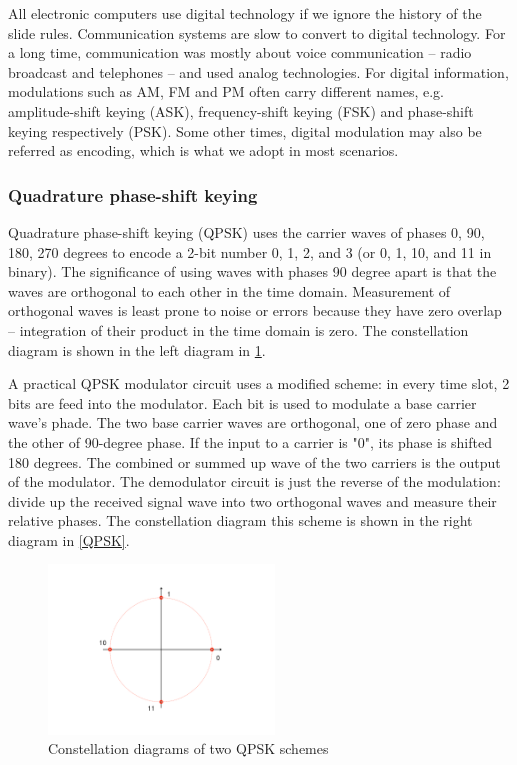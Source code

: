 \documentclass{book}
\begin{document}
All electronic computers use digital technology if we ignore the history of the slide rules. Communication systems are slow to convert to digital technology. For a long time, communication was mostly about voice communication -- radio broadcast and telephones -- and used analog technologies. For digital information, modulations such as AM, FM and PM often carry different names, e.g. amplitude-shift keying (ASK), frequency-shift keying (FSK) and phase-shift keying respectively (PSK). Some other times, digital modulation may also be referred as encoding, which is what we adopt in most scenarios.

\subsubsection{Quadrature phase-shift keying}
 Quadrature phase-shift keying (QPSK) uses the carrier waves of phases 0, 90, 180, 270 degrees to encode a 2-bit number 
0, 1, 2, and 3 
(or 0, 1, 10, and 11 in binary). The significance of using waves with phases 90 degree apart is that the 
waves are orthogonal to each other in the time domain. Measurement of orthogonal waves is least prone to noise or errors 
because they have zero overlap -- integration of their product in the time domain is zero. 
The constellation diagram is shown in the left diagram in \ref{4QPSK}.
 
 A practical QPSK modulator circuit\cite{qpsk-circuits} uses a modified scheme: in every time slot, 2 bits are feed into the modulator.
Each bit is used to modulate a base carrier wave's phade. The two base carrier waves are orthogonal, one of zero phase and the other of 90-degree phase. If the input to a carrier is "0", its phase is shifted 180 degrees. The combined or summed up wave of the two carriers is the output of the modulator. The demodulator circuit is just the reverse of the modulation: divide up the received signal wave into two orthogonal waves and measure their relative phases. The constellation diagram this scheme is shown in the right diagram in \ref{QPSK}.

\begin{figure}[ht]
\includegraphics[width=6cm]{pic/4qpsk.pdf}
\caption{Constellation diagrams of two QPSK schemes}
\label{4QPSK}
\end{figure}
\end{document}
